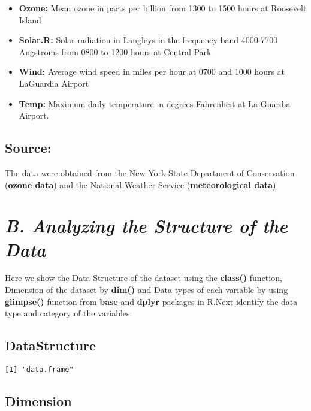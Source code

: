 \documentclass[12pt,]{article}
\begin{document}
\begin{itemize}
\item
  \textbf{Ozone:} Mean ozone in parts per billion from 1300 to 1500
  hours at Roosevelt Island
\item
  \textbf{Solar.R:} Solar radiation in Langleys in the frequency band
  4000-7700 Angstroms from 0800 to 1200 hours at Central Park
\item
  \textbf{Wind:} Average wind speed in miles per hour at 0700 and 1000
  hours at LaGuardia Airport
\item
  \textbf{Temp:} Maximum daily temperature in degrees Fahrenheit at La
  Guardia Airport.
\end{itemize}

\subsection{\texorpdfstring{\textbf{Source:}}{Source:}}\label{source}

The data were obtained from the New York State Department of
Conservation (\textbf{ozone data}) and the National Weather Service
(\textbf{meteorological data}).

\section{\texorpdfstring{\emph{B. Analyzing the Structure of the
Data}}{B. Analyzing the Structure of the Data}}\label{b.-analyzing-the-structure-of-the-data}

Here we show the Data Structure of the dataset using the
\textbf{class()} function, Dimension of the dataset by \textbf{dim()}
and Data types of each variable by using \textbf{glimpse()} function
from \textbf{base} and \textbf{dplyr} packages in R.Next identify the
data type and category of the variables.

\subsection{\texorpdfstring{\textbf{DataStructure}}{DataStructure}}\label{datastructure}

\begin{verbatim}
[1] "data.frame"
\end{verbatim}

\subsection{\texorpdfstring{\textbf{Dimension}}{Dimension}}\label{dimension}
\end{document}
